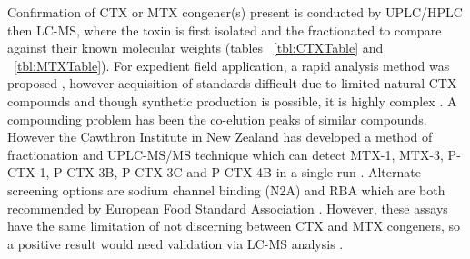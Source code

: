 \documentclass[12pt]{article}
\begin{document}
Confirmation of CTX or MTX congener(s) present is conducted by UPLC/HPLC then LC-MS, where the toxin is first isolated and the fractionated to compare against their known molecular weights (tables ~\ref{tbl:CTXTable} and ~\ref{tbl:MTXTable}). For expedient field application, a rapid analysis method was proposed \cite{lewis2009rapid}, however acquisition of standards difficult due to limited natural CTX compounds \cite{berdalet2012global} and though synthetic production is possible, it is highly complex \cite{hirama2001total}. A compounding problem has been the co-elution peaks of similar compounds. However the Cawthron Institute in New Zealand has developed a method of fractionation and UPLC-MS/MS technique which can detect MTX-1, MTX-3, P-CTX-1, P-CTX-3B, P-CTX-3C and P-CTX-4B in a single run \cite{selwoodICHA}.
Alternate screening options are sodium channel binding (N2A) \cite{dickey2010ciguatera} and RBA \cite{poli1997identification,darius2007ciguatera} which are both recommended by European Food Standard Association \cite{}. %
However, these assays have the same limitation of not discerning between CTX and MTX congeners, so a positive result would need validation via LC-MS analysis \cite{diogened2014chemistry,mak2013pacific}. 

\end{document}
